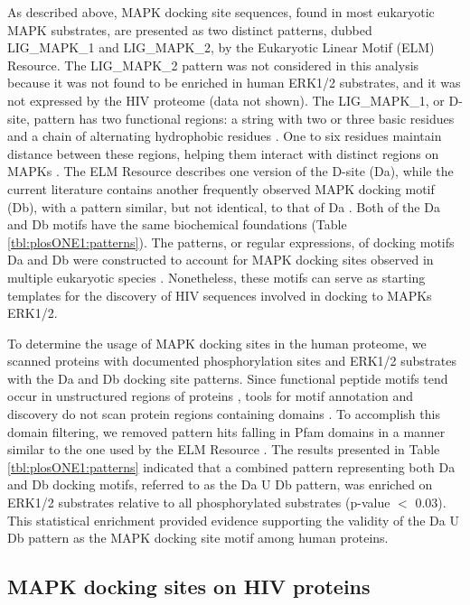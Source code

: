 

As described above, MAPK docking site sequences, found in most
eukaryotic MAPK substrates, are presented as two distinct patterns,
dubbed LIG\_MAPK\_1 and LIG\_MAPK\_2, by the Eukaryotic Linear Motif
(ELM) Resource. The LIG\_MAPK\_2 pattern was not considered in this
analysis because it was not found to be enriched in human ERK1/2
substrates, and it was not expressed by the HIV proteome (data not
shown). The LIG\_MAPK\_1, or D-site, pattern has two functional
regions: a string with two or three basic residues and a chain of
alternating hydrophobic residues \cite{bardwell09}. One to six
residues maintain distance between these regions, helping them
interact with distinct regions on MAPKs \cite{bardwell06}. The ELM
Resource describes one version of the D-site (Da), while the current
literature contains another frequently observed MAPK docking motif
(Db), with a pattern similar, but not identical, to that of Da
\cite{bardwell09}. Both of the Da and Db motifs have the same
biochemical foundations (Table \ref{tbl:plosONE1:patterns}). The
patterns, or regular expressions, of docking motifs Da and Db were
constructed to account for MAPK docking sites observed in multiple
eukaryotic species \cite{puntervoll03}. Nonetheless, these motifs can
serve as starting templates for the discovery of HIV sequences
involved in docking to MAPKs ERK1/2.

To determine the usage of MAPK docking sites in the human proteome, we
scanned proteins with documented phosphorylation sites \cite{lee06}
and ERK1/2 substrates \cite{lee06} with the Da and Db docking site
patterns. Since functional peptide motifs tend occur in unstructured
regions of proteins \cite{gould2010elm}, tools for motif annotation
and discovery do not scan protein regions containing domains
\cite{puntervoll03,neduva06nuc,edwards07}. To accomplish this domain
filtering, we removed pattern hits falling in Pfam domains
\cite{finn08} in a manner similar to the one used by the ELM Resource
\cite{puntervoll03}. The results presented in Table
\ref{tbl:plosONE1:patterns} indicated that a combined pattern
representing both Da and Db docking motifs, referred to as the Da U Db
pattern, was enriched on ERK1/2 substrates relative to all
phosphorylated substrates (p-value $<$ 0.03). This statistical
enrichment provided evidence supporting the validity of the Da U Db
pattern as the MAPK docking site motif among human proteins.

\subsection{MAPK docking sites on HIV proteins}

